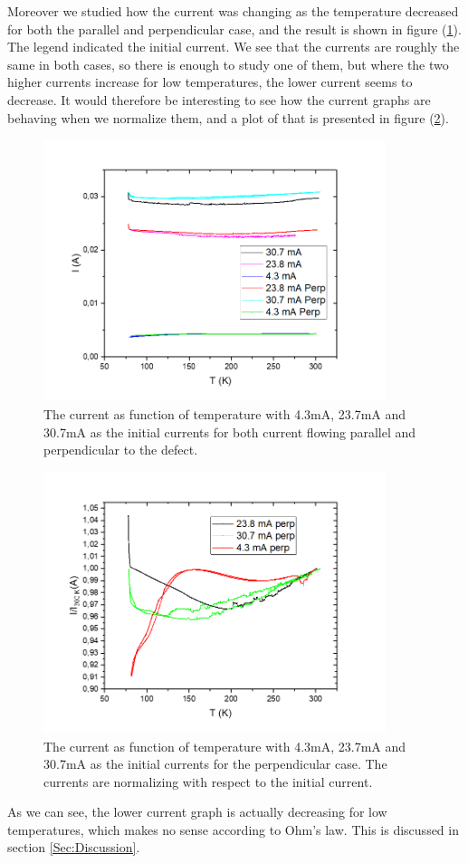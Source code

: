 \documentclass{comjnl}
\begin{document}
Moreover we studied how the current was changing as the temperature decreased for both the parallel and perpendicular case, and the result is shown in figure (\ref{fig:cur}). The legend indicated the initial current. We see that the currents are roughly the same in both cases, so there is enough to study one of them, but where the two higher currents increase for low temperatures, the lower current seems to decrease. It would therefore be interesting to see how the current graphs are behaving when we normalize them, and a plot of that is presented in figure (\ref{fig:cur_norm}). 
\begin{figure}[h]
\centering
\includegraphics[width=100mm]{Bilde3.png}
\caption{The current as function of temperature with 4.3mA, 23.7mA and 30.7mA as the initial currents for both current flowing parallel and perpendicular to the defect.\label{fig:cur}}
\end{figure}
\begin{figure}[h]
\centering
\includegraphics[width=100mm]{Bilde4.png}
\caption{The current as function of temperature with 4.3mA, 23.7mA and 30.7mA as the initial currents for the perpendicular case. The currents are normalizing with respect to the initial current.\label{fig:cur_norm}}
\end{figure}
As we can see, the lower current graph is actually decreasing for low temperatures, which makes no sense according to Ohm's law. This is discussed in section \ref{Sec:Discussion}.
\end{document}
